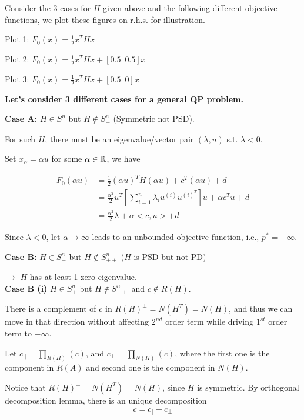 Consider the 3 cases for $H$ given above and the following different objective functions, we plot these figures on r.h.s. for illustration.

Plot 1: $F_0(x) =\frac{1}{2}x^THx$

Plot 2: $F_0(x) =\frac{1}{2}x^THx + [0.5\,\,\, 0.5]x$

Plot 3: $F_0(x) =\frac{1}{2}x^THx + [0.5\,\,\, 0]x$


\vspace{0.5cm}
\textbf{Let's consider 3 different cases for a general QP problem.}

\textbf{Case A: } $H\in S^n$ but $H\notin S^n_+$ (Symmetric not PSD).

For such $H$, there must be an eigenvalue/vector pair $(\lambda, u)$ s.t. $\lambda < 0$.

Set $x_{\alpha} = \alpha u$ for some $\alpha \in \mathbb{R}$, we have

\begin{align*}
F_0(\alpha u) &= \frac{1}{2}(\alpha u)^TH(\alpha u) + c^T(\alpha u) + d\\
&= \frac{{\alpha}^2}{2} u^T[\sum^n_{i=1}\lambda_i u^{(i)} u^{(i)^T}]u + \alpha c^Tu + d\\
&= \frac{{\alpha}^2}{2}\lambda + \alpha <c,u> + d
\end{align*}

Since $\lambda<0$, let $\alpha \to \infty$ leads to an unbounded objective function, i.e., $p^* = -\infty$.



\vspace{0.3cm}
\textbf{Case B: } $H\in S_+^n$ but $H\notin S^n_{++}$ ($H$ is PSD but not PD)

$\rightarrow$ $H$ has at least 1 zero eigenvalue.\\

\vspace{0.3cm}
\textbf{Case B (i)} $H\in S_+^n$ but $H\notin S^n_{++}$ and $c \notin R(H)$.

There is a complement of $c$ in $R(H)^{\perp} = N(H^T) = N(H)$, and thus we can move in that direction without affecting $2^{nd}$ order term while driving $1^{st} $ order term to $-\infty$.

Let $c_{||} = \prod_{R(H)}(c)$,  and $c_{\perp} = \prod_{N(H)}(c)$, where the first one is the component in $R(A)$ and second one is the component in $N(H)$.

Notice that $R(H)^{\perp}= N(H^T) = N(H)$, since $H$ is symmetric. By orthogonal decomposition lemma, there is an unique decomposition
$$c = c_{\Vert} + c_{\perp}$$

